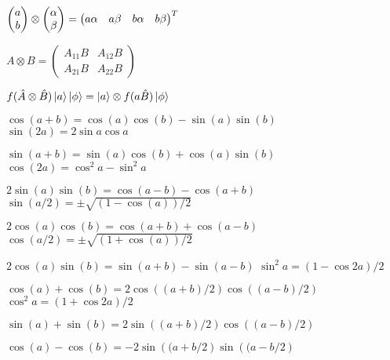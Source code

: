\begin{squishlist}
\item $\begin{pmatrix} a \\ b \end{pmatrix} \otimes \begin{pmatrix} \alpha \\ \beta \end{pmatrix} = \begin{pmatrix} a \alpha & a \beta & b \alpha & b \beta \end{pmatrix}^T$
    
\item $A \otimes B = \begin{pmatrix} A_{11}B & A_{12}B \\ A_{21}B & A_{22}B \end{pmatrix}$
\item $f(\hat{A} \otimes \hat{B}) \ket{a}\ket{\phi} = \ket{a} \otimes f(a\hat{B})\ket{\phi}$
\end{squishlist}


\begin{squishlist}
    
    \item $\cos(a+b) = \cos(a)\cos(b)-\sin(a)\sin(b)$ \squishsep $\sin(2a) = 2\sin a \cos a$
    \item $\sin(a+b) = \sin(a)\cos(b) + \cos(a)\sin(b)$ \squishsep $\cos(2a) = \cos^2 a - \sin^2 a$
    \item $2\sin(a)\sin(b) = \cos(a-b) - \cos(a+b)$ \smallsquishsep $\sin(a/2) = \pm \sqrt{(1-\cos(a))/2}$
    \item $2\cos(a)\cos(b) = \cos(a+b) + \cos(a-b)$ \smallsquishsep $\cos(a/2) = \pm \sqrt{(1+\cos(a))/2}$
    \item $2\cos(a)\sin(b) = \sin(a+b) - \sin(a-b)$ \smallsquishsep $\sin^2a = (1-\cos 2a)/2$
    \item $\cos(a) + \cos(b) = 2\cos\left((a+b)/2\right)\cos\left((a-b)/2\right)$ \;\squishitem \; $\cos^2 a = (1+\cos 2a) / 2$
    \item $\sin(a) + \sin(b) = 2\sin\left((a+b)/2\right)\cos\left((a-b)/2\right)$ 
    \item $\cos(a) - \cos(b) = -2\sin\left((a+b/2\right)\sin\left((a-b/2\right)$ 
\end{squishlist} 


